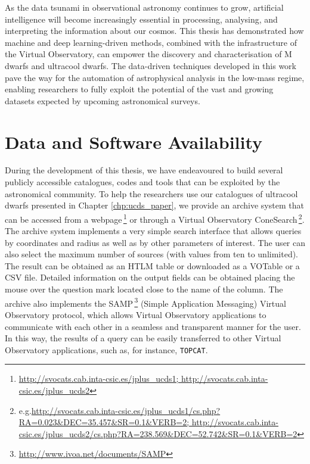As the data tsunami in observational astronomy continues to grow, artificial intelligence will become increasingly essential in processing, analysing, and interpreting the information about our cosmos. This thesis has demonstrated how machine and deep learning-driven methods, combined with the infrastructure of the Virtual Observatory, can empower the discovery and characterisation of M dwarfs and ultracool dwarfs. The data-driven techniques developed in this work pave the way for the automation of astrophysical analysis in the low-mass regime, enabling researchers to fully exploit the potential of the vast and growing datasets expected by upcoming astronomical surveys.


\chapter*{Data and Software Availability}\label{data_av}

During the development of this thesis, we have endeavoured to build several publicly accessible catalogues, codes and tools that can be exploited by the astronomical community. To help the researchers use our catalogues of ultracool dwarfs presented in Chapter \ref{chp:ucds_paper}, we provide an archive system that can be accessed  from  a webpage\,\footnote{\url{http://svocats.cab.inta-csic.es/jplus_ucds1; http://svocats.cab.inta-csic.es/jplus_ucds2}} or through a Virtual Observatory ConeSearch\,\footnote{e.g.\url{http://svocats.cab.inta-csic.es/jplus_ucds1/cs.php?RA=0.023&DEC=35.457&SR=0.1&VERB=2; http://svocats.cab.inta-csic.es/jplus_ucds2/cs.php?RA=238.569&DEC=52.742&SR=0.1&VERB=2}}. The archive system implements a  very simple search interface that allows queries by coordinates and radius as well as by other parameters of interest. The user can also select the maximum number of sources (with values from ten to unlimited). The result can be obtained as an HTLM table or downloaded as a VOTable or a CSV file. Detailed information on the output fields can be obtained placing the mouse over the question mark located close to the name of the column. The archive also implements the SAMP\,\footnote{\url{http://www.ivoa.net/documents/SAMP}} (Simple Application Messaging) Virtual Observatory protocol, which allows Virtual Observatory applications to communicate with each other in a seamless and transparent manner for the user. In this way, the results of a query can be easily transferred to other Virtual Observatory applications, such as, for instance, \texttt{TOPCAT}.

